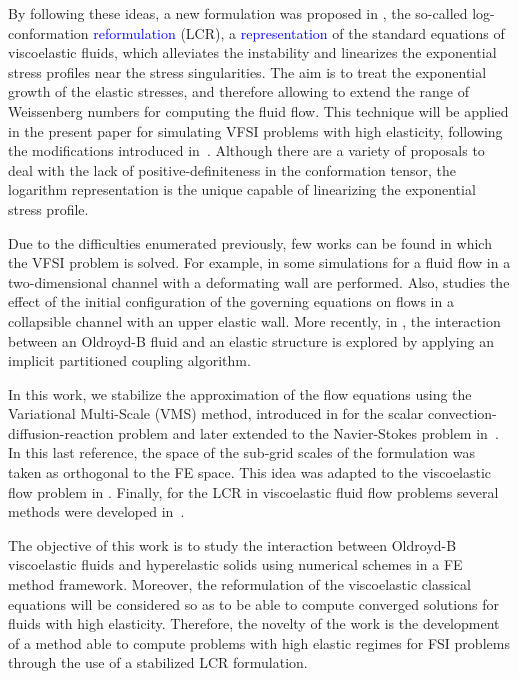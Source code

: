 \documentclass[11pt,english]{article}
\begin{document}
By following these ideas, a new formulation was proposed in \cite{fattal2004}, the so-called log-conformation \textcolor{blue}{reformulation} (LCR), a \textcolor{blue}{representation} of the standard equations of viscoelastic fluids, which alleviates the instability and linearizes the exponential stress profiles near the stress singularities. The aim is to treat the exponential growth of the elastic stresses, and therefore allowing to extend the range of Weissenberg numbers for computing the fluid flow. This technique will be applied in the present paper for simulating VFSI problems with high elasticity, following the modifications introduced in~\cite{moreno2019logarithmic}.
{Although there are a variety of proposals to deal with the lack of positive-definiteness in the conformation tensor, the logarithm representation is the unique capable of linearizing the exponential stress profile.}

Due to the difficulties enumerated previously, few works can be found in which the VFSI problem is solved. For example, in \cite{Chakraborty2007Viscoelastic} some simulations for a fluid flow in a two-dimensional channel with a deformating wall are performed. Also, \cite{Luo2007} studies the effect of the initial configuration of the governing equations on flows in a collapsible channel with an upper elastic wall. More recently, in \cite{Chen2014numerical}, the interaction between an Oldroyd-B fluid and an elastic structure is explored by applying an implicit partitioned coupling algorithm.

In this work, we stabilize the approximation of the flow equations using the Variational Multi-Scale (VMS) method, introduced in \cite{hughes1998variational} for the scalar convection-diffusion-reaction problem and later extended to the Navier-Stokes problem in~\cite{Codina02,CodinaOSS2002,Codina2008Oseen}. In this last reference, the space of the sub-grid scales of the formulation was taken as orthogonal to the FE space. This idea was adapted to the viscoelastic flow problem in \cite{castillo2014}. Finally, for the LCR in viscoelastic fluid flow problems several methods were developed in~\cite{moreno2019logarithmic}. 

The objective of this work is to study the interaction between Oldroyd-B viscoelastic fluids and hyperelastic solids using numerical schemes in a FE method framework. Moreover, the reformulation of the viscoelastic classical equations will be considered so as to be able to compute converged solutions for fluids with high elasticity. Therefore, the novelty of the work is the development of a method able to compute problems with high elastic regimes for FSI problems through the use of a stabilized LCR formulation.
\end{document}
